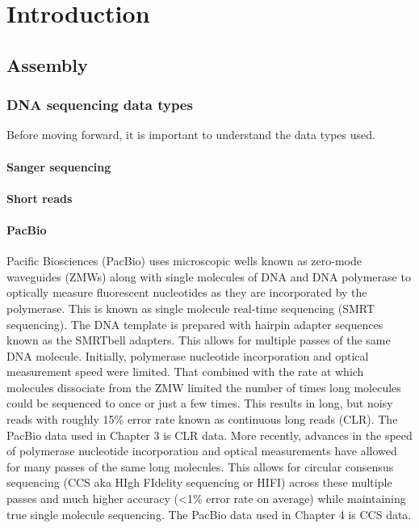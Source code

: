 
\chapter{Introduction}

\ifpdf
    \graphicspath{{Chapter1/Figs/Raster/}{Chapter1/Figs/PDF/}{Chapter1/Figs/}}
\else
    \graphicspath{{Chapter1/Figs/Vector/}{Chapter1/Figs/}}
\fi

\section{Assembly}
\subsection{DNA sequencing data types}
\par{
Before moving forward, it is important to understand the data types used. 
}

\subsubsection{Sanger sequencing}

\subsubsection{Short reads}


\subsubsection{PacBio}

\par{
Pacific Biosciences (PacBio) uses microscopic wells known as zero-mode waveguides (ZMWs) along with single molecules of DNA and DNA polymerase to optically measure fluorescent nucleotides as they are incorporated by the polymerase. This is known as single molecule real-time sequencing (SMRT sequencing). The DNA template is prepared with hairpin adapter sequences known as the SMRTbell adapters. This allows for multiple passes of the same DNA molecule. Initially, polymerase nucleotide incorporation and optical measurement speed were limited. That combined with the rate at which molecules dissociate from the ZMW limited the number of times long molecules could be sequenced to once or just a few times. This results in long, but noisy reads with roughly 15\% error rate\cite{pacbio}\cite{blasr}\cite{clrerror} known as continuous long reads (CLR). The PacBio data used in Chapter 3 is CLR data. More recently, advances in the speed of polymerase nucleotide incorporation and optical measurements have allowed for many passes of the same long molecules. This allows for circular consensus sequencing (CCS aka HIgh FIdelity sequencing or HIFI) across these multiple passes and much higher accuracy (<1\% error rate on average) while maintaining true single molecule sequencing\cite{HIFI}. The PacBio data used in Chapter 4 is CCS data.
}


